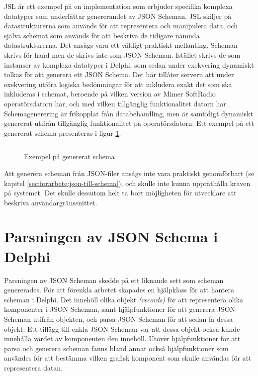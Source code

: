 JSL är ett exempel på en implementation som erbjuder specifika komplexa datatyper som underlättar genererandet av JSON Scheman. JSL skiljer på datastrukturerna som används för att representera och manipulera data, och själva schemat som används för att beskriva de tidigare nämnda datastrukturerna. \cite{Romanovich} Det ansågs vara ett väldigt praktiskt mellanting. Scheman skrivs för hand men de skrivs inte som JSON Scheman. Istället skrivs de som instanser av komplexa datatyper i Delphi, som sedan under exekvering dynamiskt tolkas för att generera ett JSON Schema. Det här tillåter servern att under exekvering utföra logiska bedömningar för att inkludera exakt det som ska inkluderas i schemat, beroende på vilken version av Mimer SoftRadio operatörsdatorn har, och med vilken tillgänglig funktionalitet datorn har. Schemagenerering är frikopplat från databehandling, men är samtidigt dynamiskt genererat utifrån tillgänglig funktionalitet på operatörsdatorn. Ett exempel på ett genererat schema presenteras i figur \ref{fig:real-schema}.

\begin{figure}
	\inputminted[tabsize=2, frame=single, fontsize=\tiny, framesep=2mm, breaklines]{json}{code/schema.json}
	\vspace{-1.7em}
	\caption{Exempel på genererat schema}
	\label{fig:real-schema}
\end{figure}

Att generera scheman från JSON-filer ansågs inte vara praktiskt genomförbart (se kapitel \ref{sec:forarbete:json-till-schema}), och skulle inte kunna uppräthålla kraven på systemet. Det skulle dessutom helt ta bort möjligheten för utvecklare att beskriva användargränssnittet.

\section{Parsningen av JSON Schema i Delphi}
\label{sec:arbetet:parsning}

Parsningen av JSON Scheman skedde på ett liknande sett som scheman genererades. För att förenkla arbetet skapades en hjälpklass för att hantera scheman i Delphi. Det innehöll olika objekt \textit{(records)} för att representera olika komponenter i JSON Scheman, samt hjälpfunktioner för att generera JSON Scheman utifrån objekten, och parsa JSON Scheman för att sedan få dessa objekt. Ett tillägg till enkla JSON Scheman var att dessa objekt också kunde innehålla värdet av komponenten den innehöll. Utöver hjälpfunktioner för att parsa och generera scheman fanns bland annat också hjälpfunktioner som användes för att bestämma vilken grafisk komponent som skulle användas för att representera datan.

